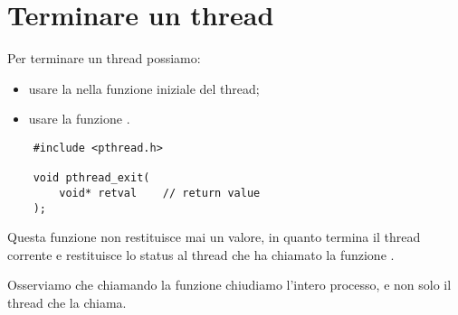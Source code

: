 \section{Terminare un thread}

Per terminare un thread possiamo:
\begin{itemize}
    \item usare la  nella funzione iniziale del thread;
    \item usare la funzione .
\end{itemize}

\begin{verbatim}
    #include <pthread.h>

    void pthread_exit(
        void* retval    // return value
    );
\end{verbatim}

Questa funzione non restituisce mai un valore, in quanto termina il thread corrente e restituisce lo status al thread che ha chiamato la funzione .

Osserviamo che chiamando la funzione  chiudiamo l'intero processo, e non solo il thread che la chiama.